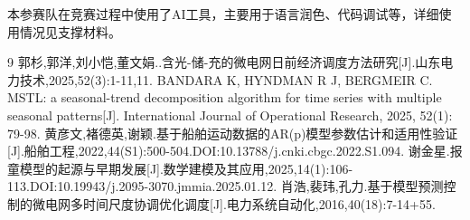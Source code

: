 \documentclass[withoutpreface,bwprint]{cumcmthesis}
\begin{document}
本参赛队在竞赛过程中使用了AI工具，主要用于语言润色、代码调试等，详细使用情况见支撑材料。


\nocite{*}
\begin{thebibliography}{9}%
 	郭杉,郭洋,刘小恺,董文娟..含光-储-充的微电网日前经济调度方法研究[J].山东电力技术,2025,52(3):1-11,11.
 BANDARA K, HYNDMAN R J, BERGMEIR C. MSTL: a seasonal-trend decomposition algorithm for time series with multiple seasonal patterns[J]. International Journal of Operational Research, 2025, 52(1): 79-98.
 黄彦文,褚德英,谢颖.基于船舶运动数据的AR(p)模型参数估计和适用性验证[J].船舶工程,2022,44(S1):500-504.DOI:10.13788/j.cnki.cbgc.2022.S1.094.
 谢金星.报童模型的起源与早期发展[J].数学建模及其应用,2025,14(1):106-113.DOI:10.19943/j.2095-3070.jmmia.2025.01.12.
 肖浩,裴玮,孔力.基于模型预测控制的微电网多时间尺度协调优化调度[J].电力系统自动化,2016,40(18):7-14+55.
\end{thebibliography}
\end{document}
